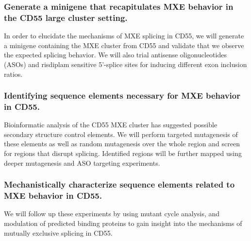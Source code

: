 \documentclass{article}
\begin{document}
\subsubsection{Generate a minigene that recapitulates MXE behavior in the CD55 large cluster setting.}  
In order to elucidate the mechanisms of MXE splicing in CD55, we will generate a minigene containing the MXE cluster from CD55 and validate that we observe the expected splicing behavior. 
We will also trial antisense oligonucleotides (ASOs) and risdiplam sensitive 5'-splice sites for inducing different exon inclusion ratios.
%
\subsubsection{Identifying sequence elements necessary for MXE behavior in CD55.} 
Bioinformatic analysis of the CD55 MXE cluster has suggested possible secondary structure control elements.\Cite{Hatje2017-oj} 
We will perform targeted mutagenesis of these elements as well as random mutagenesis over the whole region and screen for regions that disrupt splicing. 
Identified regions will be further mapped using deeper mutagenesis and ASO targeting experiments.
%
\subsubsection{Mechanistically characterize sequence elements related to MXE behavior in CD55.} 
We will follow up these experiments by using mutant cycle analysis, and modulation of predicted binding proteins to gain insight into the mechanisms of mutually exclusive splicing in CD55.




\printbibliography
\end{document}
